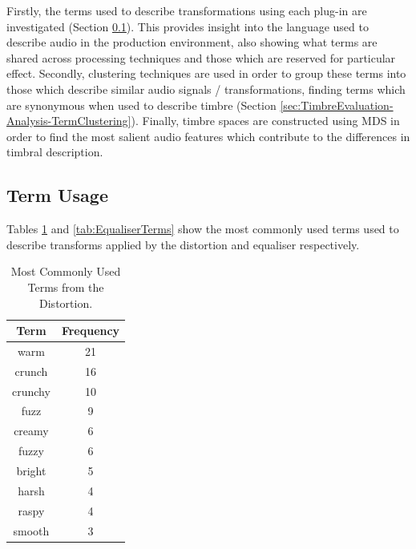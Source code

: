	Firstly, the terms used to describe transformations using each plug-in are investigated (Section
	\ref{sec:TimbreEvaluation-Analysis-TermUsage}). This provides insight into the language used to describe audio in
	the production environment, also showing what terms are shared across processing techniques and those which are
	reserved for particular effect. Secondly, clustering techniques are used in order to group these terms into those
	which describe similar audio signals / transformations, finding terms which are synonymous when used to describe
	timbre (Section \ref{sec:TimbreEvaluation-Analysis-TermClustering}). Finally, timbre spaces are constructed using
	MDS in order to find the most salient audio features which contribute to the differences in timbral description.

	\subsection{Term Usage}
	\label{sec:TimbreEvaluation-Analysis-TermUsage}
		Tables \ref{tab:DistortionTerms} and \ref{tab:EqualiserTerms} show the most commonly used terms used to
		describe transforms applied by the distortion and equaliser respectively.

		\begin{table}[h!]
			\centering
			\begin{tabular}{|c|c|}
				\hline
				\bf{Term} & \bf{Frequency} \\
				\hline
				\hline
				warm & 21 \\
				\hline
				crunch & 16 \\
				\hline
				crunchy & 10 \\
				\hline
				fuzz & 9 \\
				\hline
				creamy & 6 \\
				\hline
				fuzzy & 6 \\
				\hline
				bright & 5 \\
				\hline
				harsh & 4 \\
				\hline
				raspy & 4 \\
				\hline
				smooth & 3 \\
				\hline
			\end{tabular}
			\caption{Most Commonly Used Terms from the Distortion.}
			\label{tab:DistortionTerms}
		\end{table}

